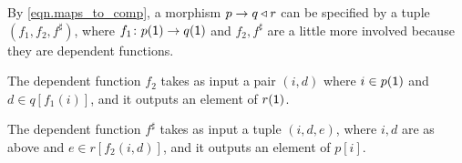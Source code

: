 \documentclass[DynamicalBook]{subfiles}
\begin{document}

\begin{example}\label{ex.map_to_comp}
By \eqref{eqn.maps_to_comp}, a morphism $p\to q\mathbin{\triangleleft} r$ can be specified by a tuple $(f_1,f_2,f^\sharp)$, where $f_1\colon p(\textsf{1})\to q(\textsf{1})$ and $f_2,f^\sharp$ are a little more involved because they are dependent functions.

The dependent function $f_2$ takes as input a pair $(i,d)$ where $i\in p(\textsf{1})$ and $d\in q[f_1(i)]$, and it outputs an element of $r(\textsf{1})$.

The dependent function $f^\sharp$ takes as input a tuple $(i,d,e)$, where $i,d$ are as above and $e\in r[f_2(i,d)]$, and it outputs an element of $p[i]$.


\end{example}
\end{document}
